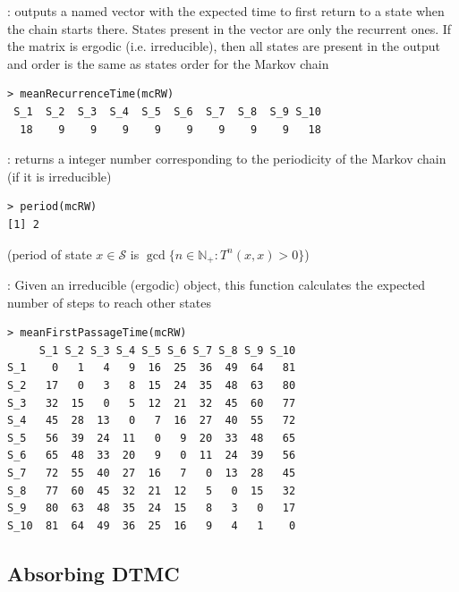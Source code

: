\documentclass[aspectratio=43]{beamer}
\begin{document}
\begin{frame}[fragile]
: outputs a named vector with the expected time to first return to a state when the chain starts there. States present in the vector are only the recurrent ones. If the matrix is ergodic (i.e. irreducible), then all states are present in the output and order is the same as states order for the Markov chain
\begin{lstlisting}[language=Renhanced]
> meanRecurrenceTime(mcRW)
 S_1  S_2  S_3  S_4  S_5  S_6  S_7  S_8  S_9 S_10 
  18    9    9    9    9    9    9    9    9   18 
\end{lstlisting}
\vfill
{}: returns a integer number corresponding to the periodicity of the Markov chain (if it is irreducible)
\begin{lstlisting}[language=Renhanced]
> period(mcRW)
[1] 2
\end{lstlisting}
(period of state $x\in\mathcal{S}$ is $\gcd\{n\in\mathbb{N}_+: T^n(x,x)>0\}$)
\end{frame}

\begin{frame}[fragile]
: Given an irreducible (ergodic)  object, this function calculates the expected number of steps to reach other states

\begin{lstlisting}[language=Renhanced]
> meanFirstPassageTime(mcRW)
     S_1 S_2 S_3 S_4 S_5 S_6 S_7 S_8 S_9 S_10
S_1    0   1   4   9  16  25  36  49  64   81
S_2   17   0   3   8  15  24  35  48  63   80
S_3   32  15   0   5  12  21  32  45  60   77
S_4   45  28  13   0   7  16  27  40  55   72
S_5   56  39  24  11   0   9  20  33  48   65
S_6   65  48  33  20   9   0  11  24  39   56
S_7   72  55  40  27  16   7   0  13  28   45
S_8   77  60  45  32  21  12   5   0  15   32
S_9   80  63  48  35  24  15   8   3   0   17
S_10  81  64  49  36  25  16   9   4   1    0
\end{lstlisting}
\end{frame}
\subsection{Absorbing DTMC}
\end{document}
